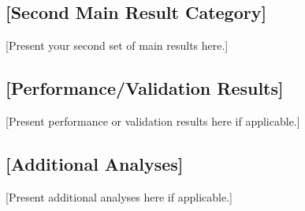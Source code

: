 \subsection{[Second Main Result Category]}

[Present your second set of main results here.]


\subsection{[Performance/Validation Results]}


[Present performance or validation results here if applicable.]


\subsection{[Additional Analyses]}

[Present additional analyses here if applicable.]


%
%

\label{sec:results}

